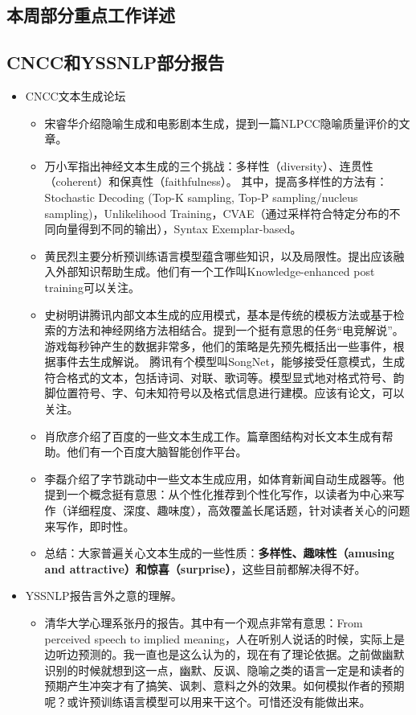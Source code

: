 \documentclass[11pt]{article}
\begin{document}
\begin{CJK}{UTF8}{gkai}
\section{本周部分重点工作详述}

\subsection{CNCC和YSSNLP部分报告}
\begin{itemize}
\item CNCC文本生成论坛
\begin{itemize}
\item 宋睿华介绍隐喻生成和电影剧本生成，提到一篇NLPCC隐喻质量评价的文章。
\item 万小军指出神经文本生成的三个挑战：多样性（diversity）、连贯性（coherent）和保真性（faithfulness）。
其中，提高多样性的方法有：Stochastic Decoding (Top-K sampling, Top-P sampling/nucleus sampling)，Unlikelihood Training，CVAE（通过采样符合特定分布的不同向量得到不同的输出），Syntax Exemplar-based。
\item 黄民烈主要分析预训练语言模型蕴含哪些知识，以及局限性。提出应该融入外部知识帮助生成。他们有一个工作叫Knowledge-enhanced post training可以关注。
\item 史树明讲腾讯内部文本生成的应用模式，基本是传统的模板方法或基于检索的方法和神经网络方法相结合。提到一个挺有意思的任务“电竞解说”。游戏每秒钟产生的数据非常多，他们的策略是先预先概括出一些事件，根据事件去生成解说。
腾讯有个模型叫SongNet，能够接受任意模式，生成符合格式的文本，包括诗词、对联、歌词等。模型显式地对格式符号、韵脚位置符号、字、句未知符号以及格式信息进行建模。应该有论文，可以关注。
\item 肖欣彦介绍了百度的一些文本生成工作。篇章图结构对长文本生成有帮助。他们有一个百度大脑智能创作平台。
\item 李磊介绍了字节跳动中一些文本生成应用，如体育新闻自动生成器等。他提到一个概念挺有意思：从个性化推荐到个性化写作，以读者为中心来写作（详细程度、深度、趣味度），高效覆盖长尾话题，针对读者关心的问题来写作，即时性。
\item 总结：大家普遍关心文本生成的一些性质：\textbf{多样性、趣味性（amusing and attractive）和惊喜（surprise）}，这些目前都解决得不好。
\end{itemize}
\item YSSNLP报告言外之意的理解。
\begin{itemize}
\item 清华大学心理系张丹的报告。其中有一个观点非常有意思：From perceived speech to implied meaning，人在听别人说话的时候，实际上是边听边预测的。我一直也是这么认为的，现在有了理论依据。之前做幽默识别的时候就想到这一点，幽默、反讽、隐喻之类的语言一定是和读者的预期产生冲突才有了搞笑、讽刺、意料之外的效果。如何模拟作者的预期呢？或许预训练语言模型可以用来干这个。可惜还没有能做出来。
\end{itemize}
\end{itemize}


\end{CJK}
\end{document}
